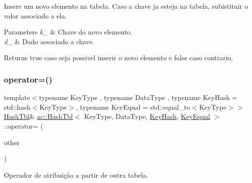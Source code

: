 Insere um novo elemento na tabela. Caso a chave ja esteja na tabela, subistituir o valor associado a ela. 
\begin{DoxyParams}{Parameters}
{\em k\+\_\+} & Chave do novo elemento. \\
\hline
{\em d\+\_\+} & Dado associado a chave. \\
\hline
\end{DoxyParams}
\begin{DoxyReturn}{Returns}
true caso seja possivel inserir o novo elemento e false caso contrario. 
\end{DoxyReturn}
\mbox{\label{classac_1_1_hash_tbl_ab0907d777c09da3d1071c30a96939c71}} 
\subsubsection{\texorpdfstring{operator=()}{operator=()}\hspace{0.1cm}{\footnotesize\ttfamily [1/2]}}
{\footnotesize\ttfamily template$<$typename Key\+Type , typename Data\+Type , typename Key\+Hash  = std\+::hash$<$\+Key\+Type$>$, typename Key\+Equal  = std\+::equal\+\_\+to$<$\+Key\+Type$>$$>$ \\
\hyperlink{classac_1_1_hash_tbl}{Hash\+Tbl}\& \hyperlink{classac_1_1_hash_tbl}{ac\+::\+Hash\+Tbl}$<$ Key\+Type, Data\+Type, \hyperlink{struct_key_hash}{Key\+Hash}, \hyperlink{struct_key_equal}{Key\+Equal} $>$\+::operator= (\begin{DoxyParamCaption}\item[{const \hyperlink{classac_1_1_hash_tbl}{Hash\+Tbl}$<$ Key\+Type, Data\+Type, \hyperlink{struct_key_hash}{Key\+Hash}, \hyperlink{struct_key_equal}{Key\+Equal} $>$ \&}]{other }\end{DoxyParamCaption})\hspace{0.3cm}{\ttfamily [inline]}}

Operador de atribuição a partir de outra tabela. \mbox{\label{classac_1_1_hash_tbl_a13febc90fbc2417ec7eff89dd282cd48}} 
